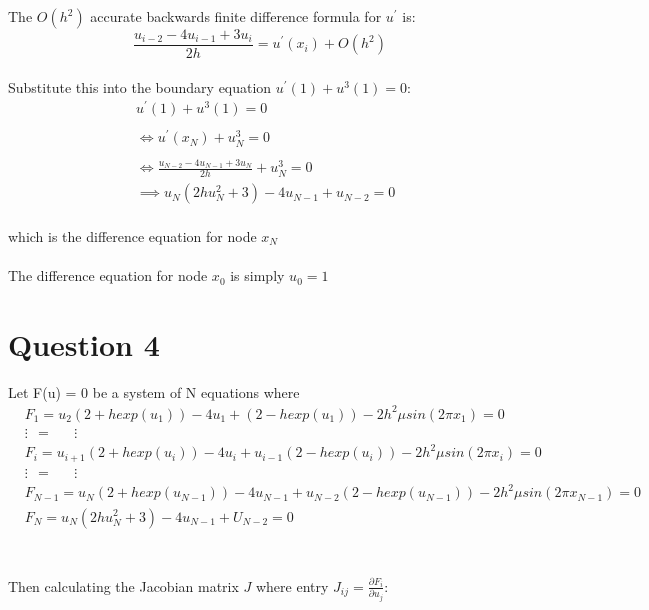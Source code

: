 \documentclass[fleqn]{report}
\begin{document}
The $O(h^2)$ accurate backwards finite difference formula for $u^{\prime}$ is:
\begin{equation}
\frac{u_{i-2} - 4u_{i-1} + 3u_i}{2h} = u^{\prime}(x_i) + O(h^2)
\end{equation}
\\
Substitute this into the boundary equation $u^{\prime}(1) + u^3(1) = 0$:
\begin{equation}
\begin{split}
&u^{\prime}(1) + u^3(1) = 0\\\\
&\iff u^{\prime}(x_N) + u_N^3 = 0\\\\
&\iff \frac{u_{N-2} - 4u_{N-1} + 3u_N}{2h} + u_N^3 = 0\\
&\implies u_N(2hu_N^2 + 3) - 4u_{N-1} + u_{N-2} = 0
\end{split}
\end{equation}
\\
which is the difference equation for node $x_N$\\\\
The difference equation for node $x_0$ is simply $u_0 = 1$

\section{Question 4}

Let F(u) = 0 be a system of N equations where
\begin{equation}
\begin{split} 
&F_1 = u_{2}(2 + hexp(u_1)) - 4u_1 + (2 - hexp(u_1)) - 2h^2\mu sin(2 \pi x_1) = 0  \\
&\vdots \ \ = \ \ \ \ \ \ \                   \vdots\\
&F_i =  u_{i+1}(2 + hexp(u_i)) - 4u_i + u_{i-1}(2 - hexp(u_i)) - 2h^2\mu sin(2 \pi x_i) = 0  \\
&\vdots \ \ = \ \ \ \ \ \ \                   \vdots\\
    &F_{N-1} =  u_{N}(2 + hexp(u_{N-1})) - 4u_{N-1} + u_{N-2}(2 - hexp(u_{N-1})) - 2h^2\mu sin(2 \pi x_{N-1}) = 0\\
&F_N = u_N(2hu^2_N + 3) - 4u_{N-1} + U_{N-2} = 0\\
    \end{split}
\end{equation}
\\
\\
Then calculating the Jacobian matrix $J$ where entry $J_{ij} = \frac{\partial F_i}{\partial u_j}$:\\
\end{document}

